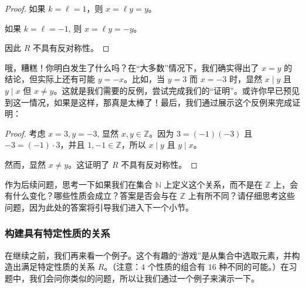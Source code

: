 \begin{example}
\begin{itemize}
\begin{proof}
            如果 $k = \ell = 1$，则 $x = \ell y = y$。

            如果 $k = \ell = -1$, 则 $x = \ell y = -y$。

            因此 $R$ 不具有反对称性。
        \end{proof}
        哦，糟糕！你明白发生了什么吗？在``大多数''情况下，我们确实得出了 $x = y$ 的结论，但实际上还有可能 $y = -x$。比如，当 $y = 3$ 而 $x = -3$ 时，显然 $x \mid y$ 且 $y \mid x$ 但 $x \ne y$。这就是我们需要的反例，尝试完成我们的``证明''。或许你早已预见到这一情况，如果是这样，那真是太棒了！最后，我们通过展示这个反例来完成证明：
        \begin{proof}
            考虑 $x=3, y=-3$, 显然 $x, y \in \mathbb{Z}$。因为 $3 = (-1)(-3)$ 且 $-3 = (-1) \cdot 3$，并且 $1, -1 \in \mathbb{Z}$，所以 $x \mid y$ 且 $y \mid x$。

            然而，显然 $x \ne y$。这证明了 $R$ 不具有反对称性。
        \end{proof}
    \end{itemize}
\end{example}

作为后续问题，思考一下如果我们在集合 $\mathbb{N}$ 上定义这个关系，而不是在 $\mathbb{Z}$ 上，会有什么变化？哪些性质会成立？答案是否会与在 $\mathbb{Z}$ 上有所不同？请仔细思考这些问题，因为此处的答案将引导我们进入下一个小节。

\subsubsection*{构建具有特定性质的关系}

在继续之前，我们再来看一个例子。这个有趣的``游戏''是从集合中选取元素，并构造出满足特定性质的关系 $R$。（注意：$4$ 个性质的组合有 $16$ 种不同的可能。）在习题中，我们会问你类似的问题，所以让我们通过一个例子来演示一下。\\

